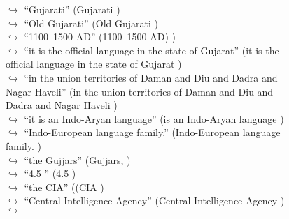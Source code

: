 \documentclass[11pt,a4paper, onecolumn]{article}
\begin{document}
\begin{figure}[t] \small \begin{tcolorbox}[boxsep=0pt,left=5pt,right=0pt,top=2pt,colback = yellow!5] \begin{dialogue}
 \small 
\colorbox{pink!25}{$\hookrightarrow$}
{ ``Gujarati'' (Gujarati ) }
\\
\colorbox{pink!25}{$\hookrightarrow$}
{ ``Old Gujarati'' (Old Gujarati ) }
\\
\colorbox{pink!25}{$\hookrightarrow$}
{ ``1100–1500 AD'' (1100–1500 AD) ) }
\\
\colorbox{pink!25}{$\hookrightarrow$}
{ ``it is the official language in the state of Gujarat'' (it is the official language in the state of Gujarat ) }
\\
\colorbox{pink!25}{$\hookrightarrow$}
{ ``in the union territories of Daman and Diu and Dadra and Nagar Haveli'' (in the union territories of Daman and Diu and Dadra and Nagar Haveli ) }
\\
\colorbox{pink!25}{$\hookrightarrow$}
{ ``it is an Indo-Aryan language'' (is an Indo-Aryan language ) }
\\
\colorbox{pink!25}{$\hookrightarrow$}
{ ``Indo-European language family.'' (Indo-European language family. ) }
\\
\colorbox{pink!25}{$\hookrightarrow$}
{ ``the Gujjars'' (Gujjars, ) }
\\
\colorbox{pink!25}{$\hookrightarrow$}
{ ``4.5 '' (4.5  ) }
\\
\colorbox{pink!25}{$\hookrightarrow$}
{ ``the CIA'' ((CIA ) }
\\
\colorbox{pink!25}{$\hookrightarrow$}
{ ``Central Intelligence Agency'' (Central Intelligence Agency ) }
\\
\colorbox{pink!25}{$\hookrightarrow$}

\end{dialogue}
\end{tcolorbox}
\end{figure}
\end{document}
